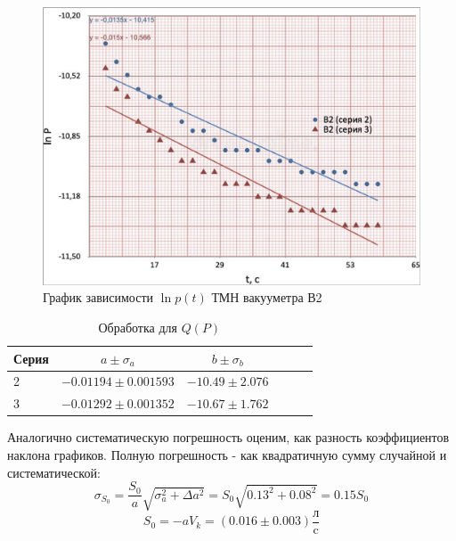 \documentclass[12pt,a4paper]{article}
\begin{document}
\begin{figure}[H]
	\caption{График зависимости $\ln{p}(t)$ ТМН вакууметра В2}
	\label{fig:TMHlnB2(t)}
	\centering
	\includegraphics[width = 11 cm]{res/TMHlnB2(t).pdf}
\end{figure}
\begin{table}[H]	
	\caption{Обработка для $Q(P)$}
	\label{tab:TMHlnB2(t)}
	\centering
	\footnotesize
	\begin{tabular}{lccccc}
		\toprule
		
		Серия & $a \pm \sigma_a$ & $b \pm \sigma_b$ \\
		\midrule
		2 & $-0.01194 \pm 0.001593$     &    $-10.49 \pm 2.076$ \\ 
		3 & $-0.01292 \pm 0.001352$     &    $-10.67 \pm 1.762$ \\ 
		\bottomrule
	\end{tabular}
\end{table}

Аналогично систематическую погрешность оценим, как разность коэффициентов наклона графиков. Полную погрешность - как квадратичную сумму случайной и систематической:
$$	\sigma_{S_0} = \frac{S_0}{a}\sqrt{\sigma_{a}^2 + \Delta a^2} = S_0 \sqrt{0.13^2 + 0.08^2} = 0.15 S_0$$
$$S_0 = -a V_k = (0.016 \pm 0.003) \frac{\text{л}}{\text{c}}$$
\end{document}
